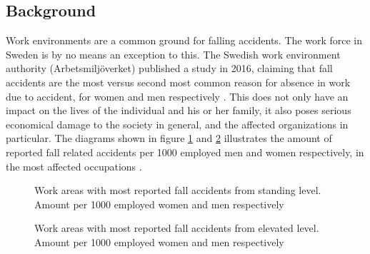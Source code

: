 \documentclass[12pt, a4paper, onecolumn]{article}
\begin{document}
	\subsection{Background}
	
	Work environments are a common ground for falling accidents. The work force in Sweden is by no means an exception to this. The Swedish work environment authority (Arbetsmiljöverket) published a study in 2016, claiming that fall accidents are the most versus second most common reason for absence in work due to accident, for women and men respectively \cite[p~1]{av}. This does not only have an impact on the lives of the individual and his or her family, it also poses serious economical damage to the society in general, and the affected organizations in particular. The diagrams shown in figure \ref{fig:Men-Women-Falling-From-Same-Ellevation} and \ref{fig:Men-And-Women-Falling-Form-Elevated-height} illustrates the amount of reported fall related accidents per 1000 employed men and women respectively, in the most affected occupations . 
	
	\begin{figure}[h]
		\centering
		\qquad
		
		\caption{Work areas with most reported fall accidents from standing level. Amount per 1000 employed women and men respectively}%
		\label{fig:Men-Women-Falling-From-Same-Ellevation}%
	\end{figure}
	
	\begin{figure}[h]
		\centering
		\qquad
		\caption{Work areas with most reported fall accidents from elevated level. Amount per 1000 employed women and men respectively}%
		\label{fig:Men-And-Women-Falling-Form-Elevated-height}%
	\end{figure}
	
\end{document}
